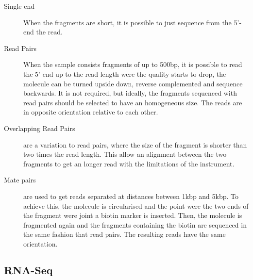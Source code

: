 \begin{description}
\item[Single end] When the fragments are short, it is possible to just sequence from the 5'-end the read.
\item[Read Pairs] When the sample consists fragments of up to 500bp, it is possible to read the 5' end up to the read length were the quality starts to drop, the molecule can be turned upside down, reverse complemented and sequence backwards. It is not required, but ideally, the fragments sequenced with read pairs should be selected to have an homogeneous size. The reads are in opposite orientation relative to each other. 
\item[Overlapping Read Pairs] are a variation to read pairs, where the size of the fragment is shorter than two times the read length. This allow an alignment between the two fragments to get an longer read with the limitations of the instrument.
\item[Mate pairs]  are used to get reads separated at distances between 1kbp and 5kbp. To achieve this, the molecule is circularised and the point were the two ends of the fragment were joint a biotin marker is inserted. Then, the molecule is fragmented again and the fragments containing the biotin are sequenced in the same fashion that read pairs. The resulting reads have the same orientation.
\end{description}


\subsection{RNA-Seq}
\label{lit:rna-seq:lab}



